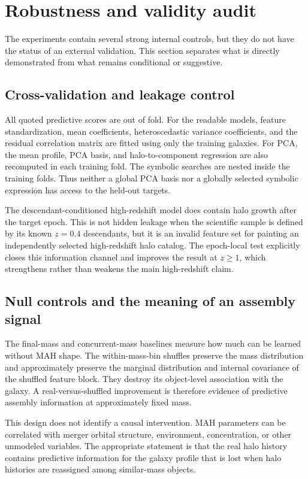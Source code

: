 \section{Robustness and validity audit}
\label{sec:robustness}

The experiments contain several strong internal controls, but they do not have
the status of an external validation. This section separates what is directly
demonstrated from what remains conditional or suggestive.

\subsection{Cross-validation and leakage control}

All quoted predictive scores are out of fold. For the readable models, feature
standardization, mean coefficients, heteroscedastic variance coefficients, and
the residual correlation matrix are fitted using only the training galaxies.
For PCA, the mean profile, PCA basis, and halo-to-component regression are also
recomputed in each training fold. The symbolic searches are nested inside the
training folds. Thus neither a global PCA basis nor a globally selected symbolic
expression has access to the held-out targets.

The descendant-conditioned high-redshift model does contain halo growth after
the target epoch. This is not hidden leakage when the scientific sample is
defined by its known $z=0.4$ descendants, but it is an invalid feature set for
painting an independently selected high-redshift halo catalog. The epoch-local
test explicitly closes this information channel and improves the result at
$z\geq1$, which strengthens rather than weakens the main high-redshift claim.

\subsection{Null controls and the meaning of an assembly signal}

The final-mass and concurrent-mass baselines measure how much can be learned
without MAH shape. The within-mass-bin shuffles preserve the mass distribution
and approximately preserve the marginal distribution and internal covariance
of the shuffled feature block. They destroy its object-level association with
the galaxy. A real-versus-shuffled improvement is therefore evidence of
predictive assembly information at approximately fixed mass.

This design does not identify a causal intervention. MAH parameters can be
correlated with merger orbital structure, environment, concentration, or other
unmodeled variables. The appropriate statement is that the real halo history
contains predictive information for the galaxy profile that is lost when halo
histories are reassigned among similar-mass objects.

